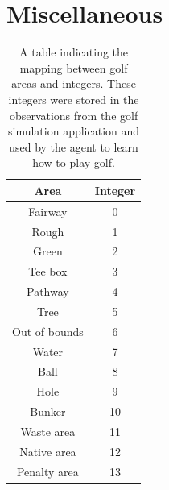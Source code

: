 \documentclass{kththesis}
\begin{document}
\chapter{Miscellaneous}
\begin{table}
    \centering
    \begin{tabular}{|c|c|}
        \hline
        \textbf{Area} & \textbf{Integer} \\ \hline
        Fairway & 0 \\ \hline
        Rough & 1 \\ \hline
        Green & 2 \\ \hline
        Tee box & 3 \\ \hline
        Pathway & 4 \\ \hline
        Tree & 5 \\ \hline
        Out of bounds & 6 \\ \hline
        Water & 7 \\ \hline
        Ball & 8 \\ \hline
        Hole & 9 \\ \hline
        Bunker & 10 \\ \hline
        Waste area & 11 \\ \hline
        Native area & 12 \\ \hline
        Penalty area & 13 \\ \hline
    \end{tabular}
    \caption{A table indicating the mapping between golf areas and integers. These integers were stored in the observations from the golf simulation application and used by the agent to learn how to play golf.}
    \label{app:tab:areamapping}
\end{table}

\tailmatter
\end{document}
